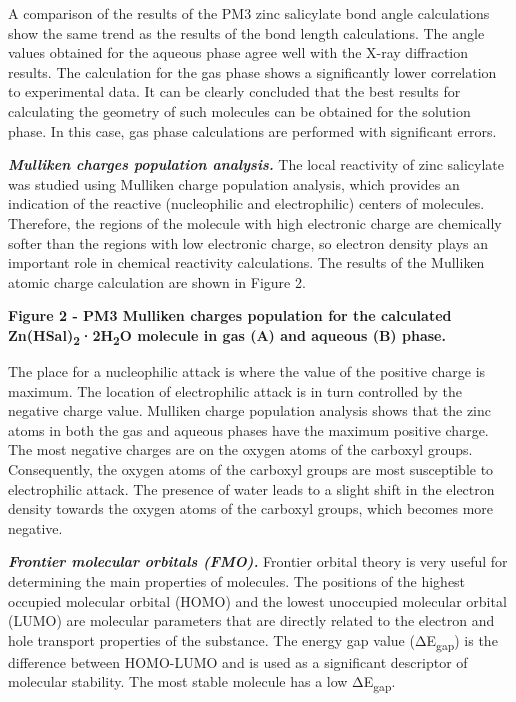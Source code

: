 A comparison of the results of the PM3 zinc salicylate bond angle
calculations show the same trend as the results of the bond length
calculations. The angle values \hspace{0pt}\hspace{0pt}obtained for the
aqueous phase agree well with the X-ray diffraction results. The
calculation for the gas phase shows a significantly lower correlation to
experimental data. It can be clearly concluded that the best results for
calculating the geometry of such molecules can be obtained for the
solution phase. In this case, gas phase calculations are performed with
significant errors.

\emph{{\bfseries Mulliken charges population analysis.}} The local
reactivity of zinc salicylate was studied using Mulliken charge
population analysis, which provides an indication of the reactive
(nucleophilic and electrophilic) centers of molecules. Therefore, the
regions of the molecule with high electronic charge are chemically
softer than the regions with low electronic charge, so electron density
plays an important role in chemical reactivity calculations. The results
of the Mulliken atomic charge calculation are shown in Figure 2.


{\bfseries Figure 2 - PM3 Mulliken charges population for the calculated
Zn(HSal)\textsubscript{2}·2H\textsubscript{2}O molecule in gas (A) and
aqueous (B) phase.}

The place for a nucleophilic attack is where the value of the positive
charge is maximum. The location of electrophilic attack is in turn
controlled by the negative charge value. Mulliken charge population
analysis shows that the zinc atoms in both the gas and aqueous phases
have the maximum positive charge. The most negative charges are on the
oxygen atoms of the carboxyl groups. Consequently, the oxygen atoms of
the carboxyl groups are most susceptible to electrophilic attack. The
presence of water leads to a slight shift in the electron density
towards the oxygen atoms of the carboxyl groups, which becomes more
negative.

\emph{{\bfseries Frontier molecular orbitals (FMO).}} Frontier orbital
theory is very useful for determining the main properties of molecules.
The positions of the highest occupied molecular orbital (HOMO) and the
lowest unoccupied molecular orbital (LUMO) are molecular parameters that
are directly related to the electron and hole transport properties of
the substance. The energy gap value (ΔE\textsubscript{gap}) is the
difference between HOMO-LUMO and is used as a significant descriptor of
molecular stability. The most stable molecule has a low
ΔE\textsubscript{gap}.

